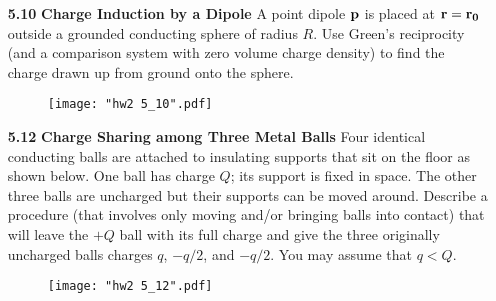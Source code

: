 \documentclass{article}
\begin{document}
\begin{enumerate}
    \item [\textbf{5.10}] \textbf{Charge Induction by a Dipole } A point dipole $\vb{p}$ is placed at $\vb{r} = \vb{r_0}$ outside a grounded conducting sphere of radius $R$. Use Green's reciprocity (and a comparison system with zero volume charge density) to find the charge drawn up from ground onto the sphere.

    \begin{figure}[H]
    \centering
    \texttt{[image: "hw2 5\_10".pdf]}
    \end{figure}

    \item [\textbf{5.12}] \textbf{Charge Sharing among Three Metal Balls } Four identical conducting balls are attached to insulating supports that sit on the floor as shown below. One ball has charge $Q$; its support is fixed in space. The other three balls are uncharged but their supports can be moved around. Describe a procedure (that involves only moving and/or bringing balls into contact) that will leave the $+Q$ ball with its full charge and give the three originally uncharged balls charges $q$, $-q/2$, and $-q/2$. You may assume that $q<Q$.

    \begin{figure}[H]
    \centering
    \texttt{[image: "hw2 5\_12".pdf]}
    \end{figure}

\end{enumerate}
\end{document}
